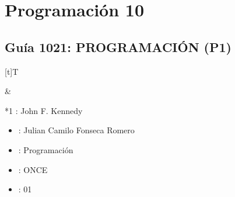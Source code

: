 \documentclass[letterpaper,10pt,spanish]{sphinxmanual}
\begin{document}
\sphinxstepscope


\chapter{Programación 10}
\label{\detokenize{1_guias/10programacion/G1020:programacion-10}}\label{\detokenize{1_guias/10programacion/G1020::doc}}
\sphinxstepscope


\section{Guía 1021: PROGRAMACIÓN (P1)}
\label{\detokenize{1_guias/10programacion/G1021:guia-1021-programacion-p1}}\label{\detokenize{1_guias/10programacion/G1021::doc}}

\begin{savenotes}\sphinxattablestart
\sphinxthistablewithglobalstyle
\centering
\begin{tabular}[t]{}
\sphinxtoprule
\sphinxtableatstartofbodyhook

\begin{savenotes}\sphinxattablestart
\sphinxthistablewithglobalstyle
\centering
\begin{tabulary}{\linewidth}[t]{T}
\sphinxtoprule
\sphinxtableatstartofbodyhook
\sphinxAtStartPar
{}
\\
\sphinxbottomrule
\end{tabulary}
\sphinxtableafterendhook\par
\sphinxattableend\end{savenotes}
&

\begin{savenotes}\sphinxattablestart
\sphinxthistablewithglobalstyle
\raggedright
\begin{tabular}[t]{*{1}{}}
\sphinxtoprule
\sphinxtableatstartofbodyhook
\sphinxAtStartPar
{}: John F. Kennedy
\begin{itemize}
\item {} 
\sphinxAtStartPar
{}: Julian Camilo Fonseca Romero

\item {} 
\sphinxAtStartPar
{}: Programación

\item {} 
\sphinxAtStartPar
{}: ONCE

\item {} 
\sphinxAtStartPar
{}: 01


\end{itemize}
\end{tabular}
\end{savenotes}
\end{tabular}
\end{savenotes}
\end{document}
